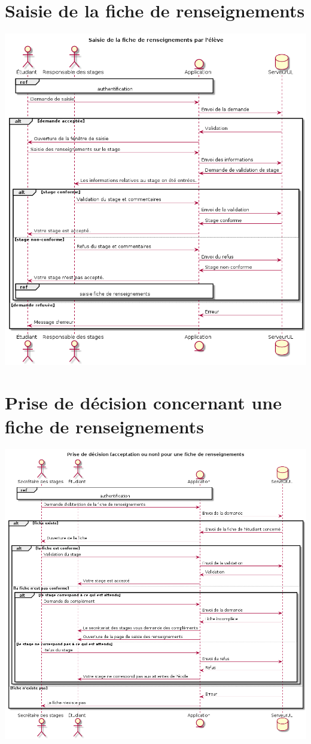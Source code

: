 \documentclass[11pt, a4paper]{report}
\begin{document}
\section*{Saisie de la fiche de renseignements}
\centerline{\includegraphics[scale=0.55]{Images/saisieficherenseignements.png}}

\section*{Prise de décision concernant une fiche de renseignements}
\centerline{\includegraphics[scale=0.5]{Images/prisededecisionfichederenseignements.png}}
 
\end{document}
